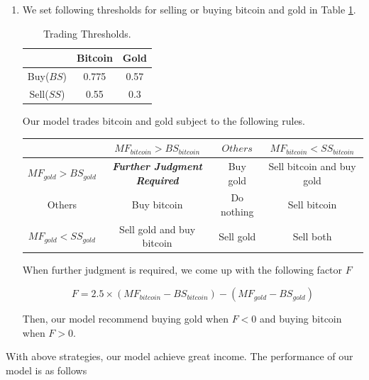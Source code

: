 \documentclass[12pt,a4paper]{article}
\begin{document}
\begin{spacing}{1.2}
\begin{enumerate}
	\item We set following thresholds for selling or buying bitcoin and gold in Table \ref{table:memo_threshold}.
	
	\begin{table}[H]
		\renewcommand{\arraystretch}{1.5}
		\caption{Trading Thresholds.}
		\label{table:memo_threshold}
		\begin{center}
			{\footnotesize
				\begin{tabular}{c c c}
					\toprule
					{ } & {Bitcoin} & {Gold} \\
					\midrule
					Buy($BS$) & 0.775 & 0.57 \\
					Sell($SS$) & 0.55 & 0.3 \\
					\bottomrule
			\end{tabular}}
		\end{center}	
	\end{table}

	Our model trades bitcoin and gold subject to the following rules.
	
	\begin{center}
		\begin{tabular}{ |c|c|c|c| } 
			\hline
			 & $MF_{bitcoin} > BS_{bitcoin}$ & $Others$ & $MF_{bitcoin} < SS_{bitcoin}$ \\ 
			\hline
			$MF_{gold} > BS_{gold}$ & \textbf{\textit{Further Judgment Required}}  & Buy gold & Sell bitcoin and buy gold  \\ 
			\hline
			Others & Buy bitcoin & Do nothing & Sell bitcoin \\
			\hline
			$MF_{gold} < SS_{gold}$ & Sell gold and buy bitcoin & Sell gold & Sell both \\ 
			\hline
		\end{tabular}
	\end{center}

	When further judgment is required, we come up with the following factor $F$ 
	
	$$
	F=2.5 \times (MF_{bitcoin}-BS_{bitcoin})-(MF_{gold}-BS_{gold})
	$$
	
	Then, our model recommend buying gold when $F<0$ and buying bitcoin when $F>0$.
\end{enumerate}

With above strategies, our model achieve great income. The performance of our model is as follows


\end{spacing}
\end{document}
